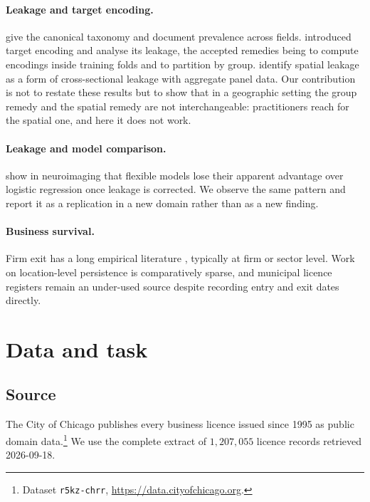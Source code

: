 \documentclass[11pt]{article}
\begin{document}
\paragraph{Leakage and target encoding.}
\citet{kaufman2012} give the canonical taxonomy and \citet{kapoor2023} document
prevalence across fields. \citet{micci2001} introduced target encoding and
\citet{prokhorenkova2018} analyse its leakage, the accepted remedies being to
compute encodings inside training folds and to partition by group.
\citet{misuse2024} identify spatial leakage as a form of cross-sectional leakage
with aggregate panel data. Our contribution is not to restate these results but
to show that in a geographic setting the group remedy and the spatial remedy are
not interchangeable: practitioners reach for the spatial one, and here it does
not work.

\paragraph{Leakage and model comparison.}
\citet{rosenblatt2024} show in neuroimaging that flexible models lose their
apparent advantage over logistic regression once leakage is corrected. We observe
the same pattern and report it as a replication in a new domain rather than as a
new finding.

\paragraph{Business survival.}
Firm exit has a long empirical literature \citep{dunne1988}, typically at firm or
sector level. Work on location-level persistence is comparatively sparse, and
municipal licence registers remain an under-used source despite recording entry
and exit dates directly.

\section{Data and task}

\subsection{Source}

The City of Chicago publishes every business licence issued since 1995 as public
domain data.\footnote{Dataset \texttt{r5kz-chrr}, \url{https://data.cityofchicago.org}.}
We use the complete extract of $1{,}207{,}055$ licence records retrieved
2026-09-18.
\end{document}
